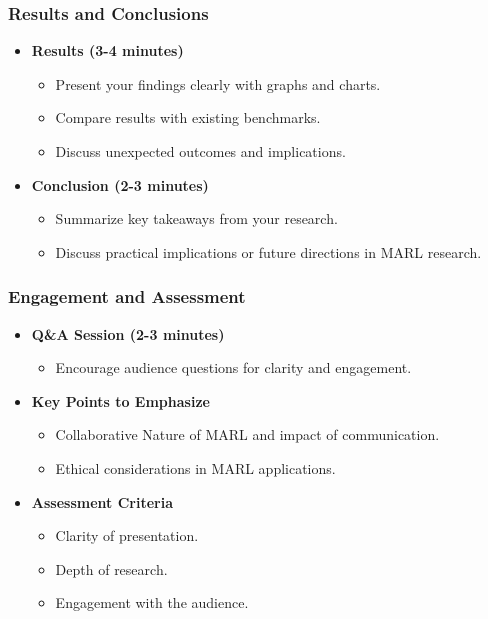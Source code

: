 \documentclass[aspectratio=169]{beamer}
\begin{document}
\begin{frame}
    \frametitle{Results and Conclusions}
    \begin{itemize}
        \item \textbf{Results (3-4 minutes)}
            \begin{itemize}
                \item Present your findings clearly with graphs and charts.
                \item Compare results with existing benchmarks.
                \item Discuss unexpected outcomes and implications.
            \end{itemize}
        \item \textbf{Conclusion (2-3 minutes)}
            \begin{itemize}
                \item Summarize key takeaways from your research.
                \item Discuss practical implications or future directions in MARL research.
            \end{itemize}
    \end{itemize}
\end{frame}

\begin{frame}
    \frametitle{Engagement and Assessment}
    \begin{itemize}
        \item \textbf{Q\&A Session (2-3 minutes)}
            \begin{itemize}
                \item Encourage audience questions for clarity and engagement.
            \end{itemize}
        \item \textbf{Key Points to Emphasize}
            \begin{itemize}
                \item Collaborative Nature of MARL and impact of communication.
                \item Ethical considerations in MARL applications.
            \end{itemize}
        \item \textbf{Assessment Criteria}
            \begin{itemize}
                \item Clarity of presentation.
                \item Depth of research.
                \item Engagement with the audience.
            \end{itemize}
    \end{itemize}
\end{frame}
\end{document}
